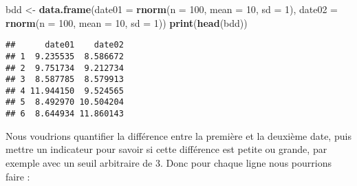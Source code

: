 \documentclass[]{book}
\newenvironment{Shaded}{\begin{snugshade}}{\end{snugshade}}
\newcommand{\KeywordTok}[1]{\textcolor[rgb]{0.13,0.29,0.53}{\textbf{#1}}}
\newcommand{\DataTypeTok}[1]{\textcolor[rgb]{0.13,0.29,0.53}{#1}}
\newcommand{\DecValTok}[1]{\textcolor[rgb]{0.00,0.00,0.81}{#1}}
\newcommand{\StringTok}[1]{\textcolor[rgb]{0.31,0.60,0.02}{#1}}
\newcommand{\NormalTok}[1]{#1}
\theoremstyle{definition}
\theoremstyle{definition}
\theoremstyle{definition}
\theoremstyle{remark}
\begin{document}
\begin{Shaded}
\begin{Highlighting}[]
\NormalTok{bdd <-}\StringTok{ }\KeywordTok{data.frame}\NormalTok{(}\DataTypeTok{date01 =} \KeywordTok{rnorm}\NormalTok{(}\DataTypeTok{n =} \DecValTok{100}\NormalTok{, }\DataTypeTok{mean =} \DecValTok{10}\NormalTok{, }\DataTypeTok{sd =} \DecValTok{1}\NormalTok{), }
                  \DataTypeTok{date02 =} \KeywordTok{rnorm}\NormalTok{(}\DataTypeTok{n =} \DecValTok{100}\NormalTok{, }\DataTypeTok{mean =} \DecValTok{10}\NormalTok{, }\DataTypeTok{sd =} \DecValTok{1}\NormalTok{))}
\KeywordTok{print}\NormalTok{(}\KeywordTok{head}\NormalTok{(bdd))}
\end{Highlighting}
\end{Shaded}

\begin{verbatim}
##      date01    date02
## 1  9.235535  8.586672
## 2  9.751734  9.212734
## 3  8.587785  8.579913
## 4 11.944150  9.524565
## 5  8.492970 10.504204
## 6  8.644934 11.860143
\end{verbatim}

Nous voudrions quantifier la différence entre la première et la deuxième
date, puis mettre un indicateur pour savoir si cette différence est
petite ou grande, par exemple avec un seuil arbitraire de 3. Donc pour
chaque ligne nous pourrions faire :
\end{document}
